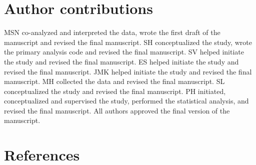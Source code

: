 \documentclass[
  9pt,
  english,
  ,jou,floatsintext]{apa6}
\begin{document}
\hypertarget{author-contributions}{%
\section{Author contributions}\label{author-contributions}}

MSN co-analyzed and interpreted the data, wrote the first draft of the
manuscript and revised the final manuscript. SH conceptualized the
study, wrote the primary analysis code and revised the final
manuscript. SV helped initiate the study and revised the final
manuscript. ES helped initiate the study and revised the final
manuscript. JMK helped initiate the study and revised the final
manuscript. MH collected the data and revised the final manuscript. SL
conceptualized the study and revised the final manuscript. PH initiated,
conceptualized and supervised the study, performed the statistical
analysis, and revised the final manuscript. All authors approved the
final version of the manuscript.

\hypertarget{references}{%
\section{References}\label{references}}
\end{document}
